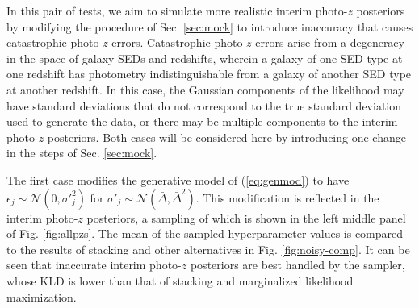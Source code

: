 \documentclass[preprint]{aastex}
\begin{document}
In this pair of tests, we aim to simulate more realistic interim photo-$z$ 
posteriors by modifying the procedure of Sec. \ref{sec:mock} to introduce 
inaccuracy that causes catastrophic photo-$z$ errors.  Catastrophic photo-$z$ 
errors arise from a degeneracy in the space of galaxy SEDs and redshifts, 
wherein a galaxy of one SED type at one redshift has photometry 
indistinguishable from a galaxy of another SED type at another redshift.  In 
this case, the Gaussian components of the likelihood may have standard 
deviations that do not correspond to the true standard deviation used to 
generate the data, or there may be multiple components to the interim photo-$z$ 
posteriors.  Both cases will be considered here by introducing one change in 
the steps of Sec. \ref{sec:mock}.  

The first case modifies the generative model of (\ref{eq:genmod}) to have 
$\epsilon_{j}\sim\mathcal{N}(0,\sigma'^{2}_{j})$ for 
$\sigma'_{j}\sim\mathcal{N}(\bar{\Delta},\bar{\Delta}^{2})$.  This modification 
is reflected in the interim photo-$z$ posteriors, a sampling of which is shown 
in the left middle panel of Fig. \ref{fig:allpzs}.  The mean of the sampled 
hyperparameter values is compared to the results of stacking and other 
alternatives in Fig. \ref{fig:noisy-comp}.  It can be seen that inaccurate 
interim photo-$z$ posteriors are best handled by the sampler, whose KLD is 
lower than that of stacking and marginalized likelihood maximization.

\end{document}
